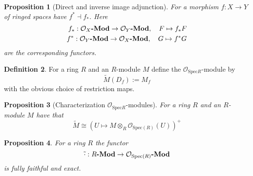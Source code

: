\documentclass{scrartcl}
\newcommand{\Mod}[1]{\text{\textbf{$#1$-Mod}}}
\newcommand{\Spec}{\mathrm{Spec}}
\renewcommand{\O}{\mathcal{O}}
\newtheorem{prop}{Proposition}[section]
\theoremstyle{definition}
\newtheorem{definition}[prop]{Definition}
\begin{document}
\begin{prop}[Direct and inverse image adjunction]
    For a morphism $f: X \to Y$ of ringed spaces have $f^* \dashv f_*$.
    Here
    \begin{align*}
        f_*: \Mod{\O_X} \to \Mod{\O_Y}, \quad F \mapsto f_*F \\
        f^*: \Mod{\O_Y} \to \Mod{\O_X}, \quad G \mapsto f^*G
    \end{align*}
    are the corresponding functors.
\end{prop}
\begin{definition}
    For a ring $R$ and an $R$-module $M$ define the $\O_{\Spec R}$-module by
    \begin{equation*}
        \tilde{M}(D_f) := M_f
    \end{equation*}
    with the obvious choice of restriction maps.
\end{definition}
\begin{prop}[Characterization $\O_{\Spec R}$-modules]
    For a ring $R$ and an $R$-module $M$ have that
    \begin{equation*}
        \tilde{M} \cong \left( U \mapsto M \otimes_R \O_{\Spec(R)}(U) \right)^+
    \end{equation*}
\end{prop}
\begin{prop}
    For a ring $R$ the functor
    \begin{equation*}
        \tilde{\cdot}: \Mod{R} \to \Mod{\O_{\Spec(R)}}
    \end{equation*}
    is fully faithful and exact.
\end{prop}
\end{document}

